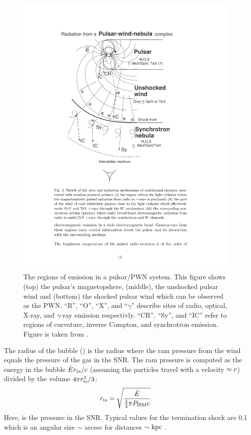 \begin{figure}[htbp]
  \centering
    \includegraphics{chapters/pulsar_pwn_system/figures/termination_shock.pdf}
  \caption{The regions of emission in a pulsar/\ac{PWN} system. 
  This figure shows (top) the pulsar's magnetopshere, (middle), the
  unshocked pulsar wind and (bottom) the shocked pulsar wind which can
  be observed as the \ac{PWN}.
  ``R'', ``O'', ``X'', and ``$\gamma$'' describe sites of radio, optical, X-ray, and
  $\gamma$-ray emission respectivly.
  ``CR'', ``Sy'', and ``IC'' refer to regions of curvature, inverse Compton, and
  synchrotron emission.
  Figure is taken from \cite{aharonian_2003_exploring-physics}.
  }
\end{figure}

The radius of the bubble (\radiusterminationshock) is the
radius where the ram pressure from the wind equals the pressure of the
gas in the \ac{SNR}. 
The ram pressure is computed as the energy in the
bubble $\dot{E} r_\text{ts}/c$ (assuming the particles
travel with a velocity $\approx c$) divided by the volume
$4\pi r_\text{ts}^3/3$:
\begin{equation}
  r_\text{ts} = \sqrt{\frac{\dot{E}}{\tfrac{4}{3}\pi P_\text{ISM} c}}.
\end{equation}
Here, \pressureISM is the pressure in the SNR.
Typical values for the termination shock are 0.1\unitspace\parsec
which is an angular size $\sim$ \ac{arcsec} for distances $\sim\text{kpc}$
\citep{gaensler_2006_evolution-structure}.

